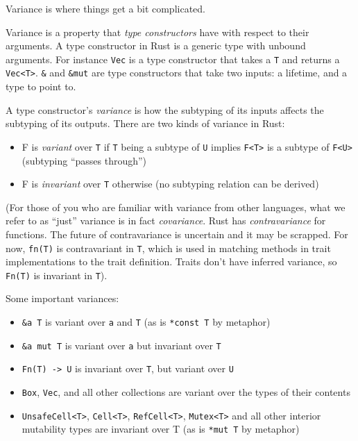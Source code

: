 \documentclass[a4paper,]{book}
\providecommand{\tightlist}{%
  \setlength{\itemsep}{0pt}\setlength{\parskip}{0pt}}
\begin{document}
Variance is where things get a bit complicated.

Variance is a property that \emph{type constructors} have with respect
to their arguments. A type constructor in Rust is a generic type with
unbound arguments. For instance \texttt{Vec} is a type constructor that
takes a \texttt{T} and returns a \texttt{Vec\textless{}T\textgreater{}}.
\texttt{\&} and \texttt{\&mut} are type constructors that take two
inputs: a lifetime, and a type to point to.

A type constructor's \emph{variance} is how the subtyping of its inputs
affects the subtyping of its outputs. There are two kinds of variance in
Rust:

\begin{itemize}
\tightlist
\item
  F is \emph{variant} over \texttt{T} if \texttt{T} being a subtype of
  \texttt{U} implies \texttt{F\textless{}T\textgreater{}} is a subtype
  of \texttt{F\textless{}U\textgreater{}} (subtyping ``passes through'')
\item
  F is \emph{invariant} over \texttt{T} otherwise (no subtyping relation
  can be derived)
\end{itemize}

(For those of you who are familiar with variance from other languages,
what we refer to as ``just'' variance is in fact \emph{covariance}. Rust
has \emph{contravariance} for functions. The future of contravariance is
uncertain and it may be scrapped. For now, \texttt{fn(T)} is
contravariant in \texttt{T}, which is used in matching methods in trait
implementations to the trait definition. Traits don't have inferred
variance, so \texttt{Fn(T)} is invariant in \texttt{T}).

Some important variances:

\begin{itemize}
\tightlist
\item
  \texttt{\&\textquotesingle{}a\ T} is variant over
  \texttt{\textquotesingle{}a} and \texttt{T} (as is \texttt{*const\ T}
  by metaphor)
\item
  \texttt{\&\textquotesingle{}a\ mut\ T} is variant over
  \texttt{\textquotesingle{}a} but invariant over \texttt{T}
\item
  \texttt{Fn(T)\ -\textgreater{}\ U} is invariant over \texttt{T}, but
  variant over \texttt{U}
\item
  \texttt{Box}, \texttt{Vec}, and all other collections are variant over
  the types of their contents
\item
  \texttt{UnsafeCell\textless{}T\textgreater{}},
  \texttt{Cell\textless{}T\textgreater{}},
  \texttt{RefCell\textless{}T\textgreater{}},
  \texttt{Mutex\textless{}T\textgreater{}} and all other interior
  mutability types are invariant over T (as is \texttt{*mut\ T} by
  metaphor)
\end{itemize}
\end{document}
